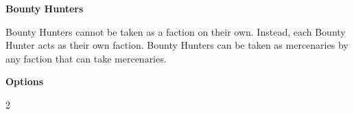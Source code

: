 \documentclass{article}
\begin{document}
\vspace{0.3cm}
{\scriptsize
\setlength\extrarowheight{1.5pt}

}

\vspace{0.6cm}

{\Large \textbf{Bounty Hunters}}
\vspace{0.3cm}

\begin{minipage}{19cm}
    Bounty Hunters cannot be taken as a faction on their own.
    Instead, each Bounty Hunter acts as their own faction.
    Bounty Hunters can be taken as mercenaries
    by any faction that can take mercenaries.
\end{minipage}

\vspace{0.3cm}
{\scriptsize
\setlength\extrarowheight{1.5pt}

}
\vspace{0.6cm}

{\large \textbf{Options}}
\vspace{0.3cm}
\begin{multicols}{2}
    {\scriptsize

    \setlength\extrarowheight{1.5pt}
    

    }
\end{multicols}
\end{document}
